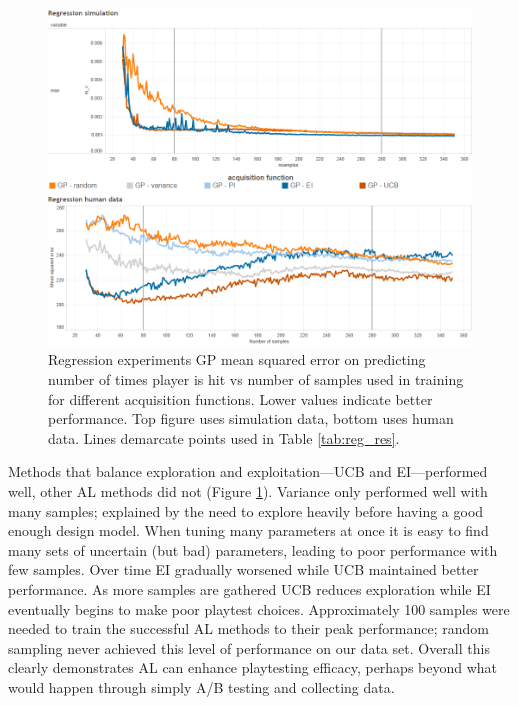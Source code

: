 \documentclass{sig-alternate}
\begin{document}
\begin{figure}[tb]
\centering
\includegraphics[width=\linewidth]{regression_results}
\caption{Regression experiments GP mean squared error on predicting number of times player is hit vs number of samples used in training for different acquisition functions. Lower values indicate better performance. Top figure uses simulation data, bottom uses human data. Lines demarcate points used in Table \ref{tab:reg_res}.}
\label{fig:reg_all}
\end{figure}


Methods that balance exploration and exploitation---UCB and EI---performed well, other AL methods did not (Figure \ref{fig:reg_all}).
Variance only performed well with many samples; explained by the need to explore heavily before having a good enough design model.
When tuning many parameters at once it is easy to find many sets of uncertain (but bad) parameters, leading to poor performance with few samples.
Over time EI gradually worsened while UCB maintained better performance.
As more samples are gathered UCB reduces exploration while EI eventually begins to make poor playtest choices.
Approximately 100 samples were needed to train the successful AL methods to their peak performance; random sampling never achieved this level of performance on our data set.
Overall this clearly demonstrates AL can enhance playtesting efficacy, perhaps beyond what would happen through simply A/B testing and collecting data.
\end{document}
